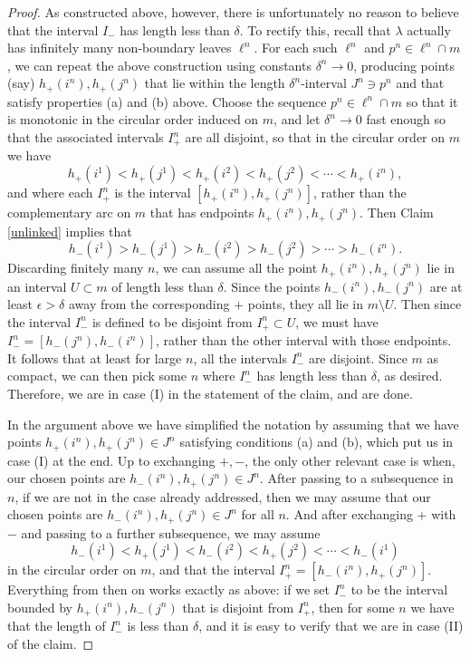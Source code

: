 \documentclass[12pt]{amsart}
\theoremstyle{definition}
\theoremstyle{remark}
\begin{document}
\begin{proof}
As constructed above, however, there is unfortunately no reason to believe that the interval $I_-$ has length less than $\delta$. To rectify this, recall that $\lambda$ actually has infinitely many non-boundary leaves $\ell^n$.  For each such $\ell^n$ and $p^n\in \ell^n \cap m$, we can repeat the above construction using constants $\delta^n\to 0$, producing points (say) $h_+(i^n),h_+(j^n)$ that lie within the length $\delta^n$-interval $J^n \ni p^n$  and that satisfy properties (a) and (b) above.  Choose the sequence $p^n \in \ell^n \cap m$ so that it is monotonic in the circular order induced on $m$, and let $\delta^n \to 0$ fast enough so that the associated intervals $I_+^n$ are all disjoint, so that in the circular order on $m$ we have
$$h_+(i^1) < h_+(j^1) < h_+(i^2) < h_+(j^2) < \cdots < h_+(i^n),$$
and where each $I_+^n$ is the interval $[h_+(i^n),h_+(j^n)]$, rather than the complementary arc on $m$ that has endpoints $h_+(i^n),h_+(j^n)$. Then Claim \ref{unlinked} implies that
$$h_-(i^1) > h_-(j^1) > h_-(i^2) > h_-(j^2) > \cdots > h_-(i^n).$$
Discarding finitely many $n$, we can assume all the point $h_+(i^n),h_+(j^n)$ lie in an interval $U\subset m$ of length less than $\delta$. Since the points $h_-(i^n),h_-(j^n)$ are at least $\epsilon>\delta$ away from the corresponding $+$ points, they all lie in $m\setminus U$. Then since the interval $I_-^n$ is defined to be disjoint from $I_+^n \subset U$,  we must have $I_-^n=[h_-(j^n), h_-(i^n)]$, rather than the other interval with those endpoints. It follows that at least for large $n$, all the intervals $I_-^n$ are disjoint. Since $m$ as compact, we can then pick some $n$ where $I_-^n$  has length less than $\delta$, as desired.  Therefore, we are in case (I) in the statement of the claim, and are done.

\medskip

In the argument above we have simplified the notation by assuming that we have points $h_+(i^n),h_+(j^n) \in J^n$ satisfying conditions (a) and (b), which put us in case (I) at the end. Up to exchanging $+,-$, the only other relevant case is when, our chosen points are $h_-(i^n),h_+(j^n) \in J^n$.  After passing to a subsequence in $n$, if we are not in the case already addressed, then we may assume that our chosen points are $h_-(i^n),h_+(j^n) \in J^n$ for all $n$. And after exchanging $+$ with $-$ and passing to a further subsequence, we may assume $$h_-(i^1) < h_+(j^1) < h_-(i^2) < h_+(j^2) < \cdots < h_-(i^1)$$
 in the circular order on $m$, and that the interval $I_+^n = [h_-(i^n), h_+(j^n)]$. Everything from then on works exactly as above: if we set $I_-^n $ to be the interval bounded by $h_+(i^n), h_-(j^n)$  that is disjoint from $ I_+^n$, then for some $n$ we have that the length of $I_-^n$ is less than $\delta$, and it is easy to verify that we are in case (II) of the claim.
\end{proof}
\end{document}

